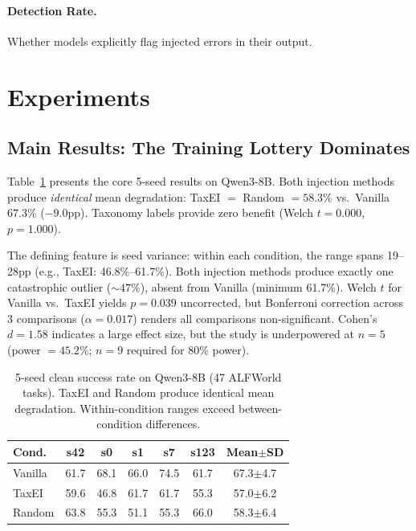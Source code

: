 \documentclass[11pt,a4paper]{article}
\begin{document}
\paragraph{Detection Rate.} Whether models explicitly flag injected errors in their output.

\section{Experiments}
\label{sec:experiments}

\subsection{Main Results: The Training Lottery Dominates}
\label{sec:main}

Table~\ref{tab:main_5seed} presents the core 5-seed results on Qwen3-8B.
Both injection methods produce \emph{identical} mean degradation: TaxEI $= $ Random $= 58.3\%$ vs.\ Vanilla $67.3\%$ ($-9.0$pp).
Taxonomy labels provide zero benefit (Welch $t{=}0.000$, $p{=}1.000$).

The defining feature is seed variance: within each condition, the range spans 19--28pp (e.g., TaxEI: 46.8\%--61.7\%).
Both injection methods produce exactly one catastrophic outlier (${\sim}47\%$), absent from Vanilla (minimum 61.7\%).
Welch $t$ for Vanilla vs.\ TaxEI yields $p{=}0.039$ uncorrected, but Bonferroni correction across 3 comparisons ($\alpha{=}0.017$) renders all comparisons non-significant.
Cohen's $d{=}1.58$ indicates a large effect size, but the study is underpowered at $n{=}5$ (power $= 45.2\%$; $n{=}9$ required for 80\% power).

\begin{table}[t]
\centering
\small
\caption{5-seed clean success rate on Qwen3-8B (47 ALFWorld tasks). TaxEI and Random produce identical mean degradation. Within-condition ranges exceed between-condition differences.}
\label{tab:main_5seed}
\begin{tabular}{lcccccc}
\toprule
\textbf{Cond.} & \textbf{s42} & \textbf{s0} & \textbf{s1} & \textbf{s7} & \textbf{s123} & \textbf{Mean$\pm$SD} \\
\midrule
Vanilla & 61.7 & 68.1 & 66.0 & 74.5 & 61.7 & 67.3$\pm$4.7 \\
TaxEI & 59.6 & 46.8 & 61.7 & 61.7 & 55.3 & 57.0$\pm$6.2 \\
Random & 63.8 & 55.3 & 51.1 & 55.3 & 66.0 & 58.3$\pm$6.4 \\
\bottomrule
\end{tabular}
\end{table}
\end{document}

